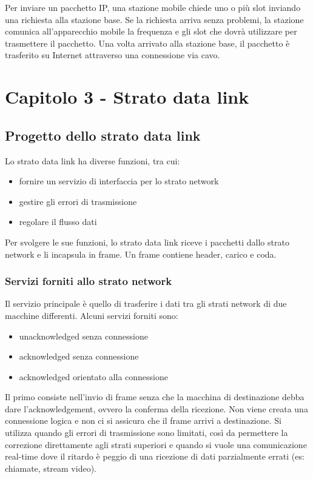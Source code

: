 Per inviare un pacchetto IP, una stazione mobile chiede uno o più slot inviando una richiesta alla stazione base.
Se la richiesta arriva senza problemi, la stazione comunica all'apparecchio mobile la frequenza e gli slot che dovrà utilizzare per trasmettere il pacchetto.
Una volta arrivato alla stazione base, il pacchetto è trasferito su Internet attraverso una connessione via cavo.

\newpage
\section{Capitolo 3 - Strato data link}

\subsection{Progetto dello strato data link} %
Lo strato data link ha diverse funzioni, tra cui:
\begin{itemize}
    \item fornire un servizio di interfaccia per lo strato network
    \item gestire gli errori di trasmissione
    \item regolare il flusso dati 
\end{itemize}
Per svolgere le sue funzioni, lo strato data link riceve i pacchetti dallo strato network e li incapsula in frame.
Un frame contiene header, carico e coda.

\subsubsection{Servizi forniti allo strato network}
Il servizio principale è quello di trasferire i dati tra gli strati network di due macchine differenti.
Alcuni servizi forniti sono:
\begin{itemize}
    \item unacknowledged senza connessione
    \item acknowledged senza connessione
    \item acknowledged orientato alla connessione
\end{itemize}
Il primo consiste nell'invio di frame senza che la macchina di destinazione debba dare l'acknowledgement, ovvero la conferma della ricezione.
Non viene creata una connessione logica e non ci si assicura che il frame arrivi a destinazione.
Si utilizza quando gli errori di trasmissione sono limitati, così da permettere la correzione direttamente agli strati superiori e
quando si vuole una comunicazione real-time dove il ritardo è peggio di una ricezione di dati parzialmente errati (es: chiamate, stream video).

